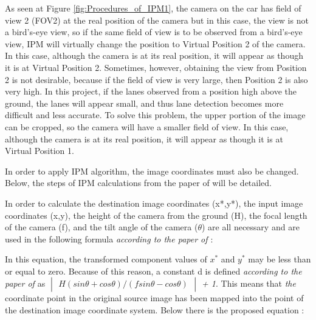  As seen at Figure \ref{fig:Procedures_of_IPM1}, the camera on the car has field of view 2 (FOV2) at the real position of the camera but in this case, the view is not a bird's-eye view, so if the same field of view is to be observed from a bird's-eye view, IPM will virtually change the position to Virtual Position 2 of the camera. In this case, although the camera is at its real position, it will appear as though it is at Virtual Position 2. Sometimes, however, obtaining the view from Position 2 is not desirable, because if the field of view is very large, then Position 2 is also very high. In this project, if the lanes observed from a position high above the ground, the lanes will appear small, and thus lane detection becomes more difficult and less accurate. To solve this problem, the upper portion of the image can be cropped, so the camera will have a smaller field of view. In this case, although the camera is at its real position, it will appear as though it is at Virtual Position 1.
  
In order to apply IPM algorithm, the image coordinates must also be changed. Below, the steps of IPM calculations from the paper of \cite{IPM} will be detailed.


In order to calculate the destination image coordinates (x*,y*), the input image coordinates (x,y), the height of the camera from the ground (H), the focal length of the camera (f), and the tilt angle of the camera ($\theta$) are all necessary and are used in the following formula \emph{\color{red}according to the paper of \cite{IPM}}:
 
\begin{center}
\end{center}

In this equation, the transformed component values of $x^*$ and $y^*$ may be less than or equal to zero. Because of 
this reason, a constant d is defined \emph{\color{red}according to the paper of \cite{IPM}} as \emph{\color{green}$
\begin{vmatrix}
H(sin \theta + cos \theta)/(f sin \theta - cos \theta) 
\end{vmatrix}
$  + 1}. This means that \emph{\color{green}the} coordinate point in the original source image has been mapped into the point of the destination image coordinate system. Below there is the proposed equation :
 
 \begin{center}
\end{center}

